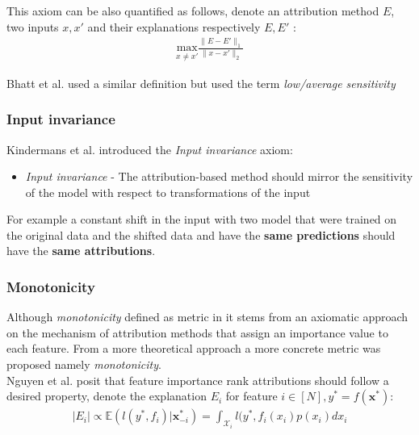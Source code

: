 \documentclass[12pt]{report}
\begin{document}
This axiom can be also quantified as follows, denote an attribution method $E$, two inputs $x,x'$ and their explanations respectively $E,E'$ :
\begin{align*}
	\underset{x \ne x'}{\text{max}} \frac{\| E-E'\|_1}{\| x-x'\|_2}
\end{align*}

Bhatt et al.  \cite{DBLP:journals/corr/abs-2005-00631}  used a similar definition but used the term \textit{low/average sensitivity}
\subsubsection{Input invariance}

Kindermans et al. \cite{https://doi.org/10.48550/arxiv.1711.00867} introduced the \textit{Input invariance} axiom:
\begin{itemize}
	\item \textit{Input invariance} - The attribution-based method should mirror the sensitivity of the model with respect to transformations of the input
\end{itemize}

For example a constant shift in the input with two model that were trained on the original data and the shifted data and have the \textbf{same predictions} should have the \textbf{same attributions}. \\

\subsubsection{Monotonicity}

Although \textit{monotonicity} defined as metric in \cite{DBLP:journals/corr/abs-2007-07584} it stems from an axiomatic approach on the mechanism of attribution methods that assign an importance value to each feature. From a more theoretical approach a more concrete metric was proposed namely \textit{monotonicity}. \\

Nguyen et al. \cite{DBLP:journals/corr/abs-2007-07584}  posit that feature importance rank attributions should follow a desired property, denote the explanation $E_i$ for feature $i \in [N], y^* = f(\mathbf{x}^*)$:
\begin{align*}
	|E_i| \propto \mathbb{E}(l(y^*, f_i)|\mathbf{x}^*_{-i}) = \int_{\mathcal{X}_i} l(y^*, f_i(x_i)p(x_i) d x_i
\end{align*}
\end{document}
